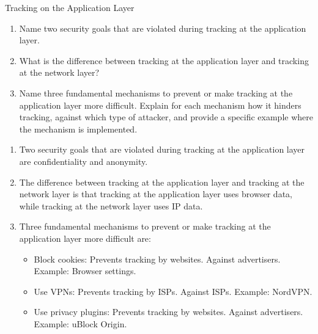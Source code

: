 \documentclass{article}
\begin{document}
\begin{exercise}{Tracking on the Application Layer}
  \begin{enumerate}
    \item Name two security goals that are violated during tracking at the application layer.
    \item What is the difference between tracking at the application layer and tracking at the network layer?
    \item Name three fundamental mechanisms to prevent or make tracking at the application layer more difficult. Explain for each mechanism how it hinders tracking, against which type of attacker, and provide a specific example where the mechanism is implemented.
  \end{enumerate}

  \begin{solution}
    \begin{enumerate}
      \item Two security goals that are violated during tracking at the application layer are confidentiality and anonymity.
      \item The difference between tracking at the application layer and tracking at the network layer is that tracking at the application layer uses browser data, while tracking at the network layer uses IP data.
      \item Three fundamental mechanisms to prevent or make tracking at the application layer more difficult are:
        \begin{itemize}
          \item Block cookies: Prevents tracking by websites. Against advertisers. Example: Browser settings.
          \item Use VPNs: Prevents tracking by ISPs. Against ISPs. Example: NordVPN.
          \item Use privacy plugins: Prevents tracking by websites. Against advertisers. Example: uBlock Origin.
        \end{itemize}
    \end{enumerate}
  \end{solution}
\end{exercise}
\end{document}
